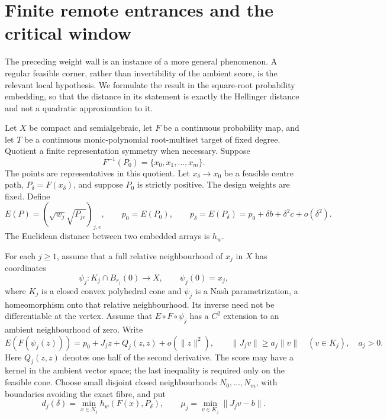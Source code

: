 \section{Finite remote entrances and the critical window}\label{sec:remote-general}
The preceding weight wall is an instance of a more general phenomenon.
A regular feasible corner, rather than invertibility of the ambient score,
is the relevant local hypothesis. We formulate the result in the
square-root probability embedding, so that the distance in its statement
is exactly the Hellinger distance and not a quadratic approximation to it.

Let $X$ be compact and semialgebraic, let $F$ be a continuous probability
map, and let $T$ be a continuous monic-polynomial root-multiset target of
fixed degree. Quotient a finite representation symmetry when necessary.
Suppose
\begin{equation}\label{eq:finite-exact-fibre}
 F^{-1}(P_0)=\{x_0,x_1,\ldots,x_m\}.
\end{equation}
The points are representatives in this quotient. Let $x_\delta\to x_0$
be a feasible centre path, $P_\delta=F(x_\delta)$, and suppose $P_0$ is
strictly positive. The design weights are fixed. Define
\[
 E(P)=(\sqrt{w_j}\sqrt{P_{je}})_{j,e},\qquad p_0=E(P_0),
 \qquad p_\delta=E(P_\delta)=p_0+\delta b+\delta^2c+o(\delta^2).
\]
The Euclidean distance between two embedded arrays is $h_w$.

For each $j\ge1$, assume that a full relative neighbourhood of $x_j$ in
$X$ has coordinates
\[
 \psi_j:K_j\cap B_{r_j}(0)\longrightarrow X,\qquad \psi_j(0)=x_j,
\]
where $K_j$ is a closed convex polyhedral cone and $\psi_j$ is a Nash
parametrization, a homeomorphism onto that relative neighbourhood. Its
inverse need not be differentiable at the vertex. Assume that
$E\circ F\circ\psi_j$ has a $C^2$ extension to an ambient neighbourhood
of zero. Write
\begin{equation}\label{eq:general-corner-jet}
 E(F(\psi_j(z)))=p_0+J_jz+Q_j(z,z)+o(\|z\|^2),\qquad
 \|J_jv\|\ge a_j\|v\|\quad(v\in K_j),\quad a_j>0.
\end{equation}
Here $Q_j(z,z)$ denotes one half of the second derivative. The score may
have a kernel in the ambient vector space; the last inequality is required
only on the feasible cone. Choose small disjoint closed neighbourhoods
$N_0,\ldots,N_m$, with boundaries avoiding the exact fibre, and put
\[
 d_j(\delta)=\min_{x\in N_j}h_w(F(x),P_\delta),\qquad
 \mu_j=\min_{v\in K_j}\|J_jv-b\|.
\]

